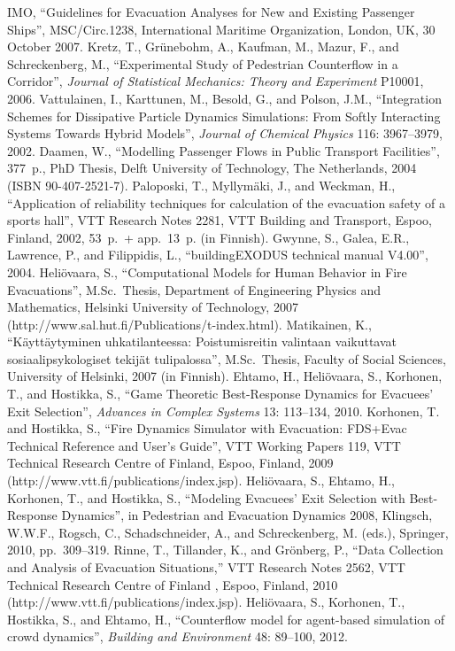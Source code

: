 \documentclass[12pt,a4paper,final,twoside]{stylevk}
\begin{document}
\begin{thebibliography}{99}
%
 IMO, ``Guidelines for Evacuation Analyses for
  New and Existing Passenger Ships'', MSC/Circ.1238, International
  Maritime Organization, London, UK, 30 October 2007.
%
 Kretz, T., Gr\"unebohm, A., Kaufman, M., Mazur, F.,
  and Schreckenberg, M., ``Experimental Study of Pedestrian
  Counterflow in a Corridor'', \emph{Journal of Statistical Mechanics:
  Theory and Experiment} P10001, 2006.
%
 Vattulainen, I., Karttunen, M., Besold, G.,
  and Polson, J.M., ``Integration Schemes for Dissipative Particle
  Dynamics Simulations: From Softly Interacting Systems Towards Hybrid
  Models'', \emph{Journal of Chemical Physics} 116: 3967--3979, 2002.
%
 Daamen, W., ``Modelling Passenger Flows in Public
  Transport Facilities'', 377~p., PhD Thesis, Delft University of
  Technology, The Netherlands, 2004 (ISBN 90-407-2521-7).
%
 Paloposki, T., Myllym\"aki, J., and Weckman, H.,
  ``Application of reliability techniques for calculation of the
  evacuation safety of a sports hall'', VTT Research Notes 2281, VTT
  Building and Transport, Espoo, Finland, 2002, 53~p.~+ app.\ 13~p. (in
  Finnish).
%
 Gwynne, S., Galea, E.R., Lawrence, P., and
  Filippidis, L., ``buildingEXODUS technical manual V4.00'', 2004.
%
 Heli\"ovaara, S., ``Computational Models for
  Human Behavior in Fire Evacuations'', M.Sc.\ Thesis, Department of
  Engineering Physics and Mathematics, Helsinki University of
  Technology, 2007 (http://www.sal.hut.fi/Publications/t-index.html).
%
 Matikainen, K., ``K\"aytt\"aytyminen
  uhkatilanteessa: Poistumisreitin valintaan vaikuttavat
  sosiaalipsykologiset tekij\"at tulipalossa'', M.Sc.\ Thesis, Faculty
  of Social Sciences, University of Helsinki, 2007 (in Finnish).
%
 Ehtamo, H., Heli\"ovaara, S., Korhonen, T., and
  Hostikka, S., ``Game Theoretic Best-Response Dynamics for Evacuees'
  Exit Selection'', \emph{Advances in Complex Systems} 13: 113--134,
  2010.
%
 Korhonen, T. and Hostikka, S., ``Fire Dynamics
  Simulator with Evacuation: FDS+Evac Technical Reference and User's
  Guide'', VTT Working Papers 119, VTT Technical Research Centre of
  Finland, Espoo, Finland, 2009
  (http://www.vtt.fi/publications/index.jsp). 
%
 Heli\"ovaara, S., Ehtamo, H., Korhonen, T., and
  Hostikka, S., ``Modeling Evacuees' Exit Selection with Best-Response
  Dynamics'', in Pedestrian and Evacuation Dynamics 2008, Klingsch,
  W.W.F., Rogsch, C., Schadschneider, A., and Schreckenberg,
  M. (eds.), Springer, 2010, pp.~309--319.
%
 Rinne, T., Tillander, K., and Grönberg, P., ``Data
  Collection and Analysis of Evacuation Situations,'' VTT Research
  Notes 2562, VTT Technical Research Centre of Finland , Espoo,
  Finland, 2010 (http://www.vtt.fi/publications/index.jsp).
%
 Heli\"ovaara, S., Korhonen, T., Hostikka, S.,
  and Ehtamo, H., ``Counterflow model for agent-based simulation of
  crowd dynamics'',  \emph{Building and Environment} 48: 89--100, 2012.
%
\end{thebibliography}
\end{document}
